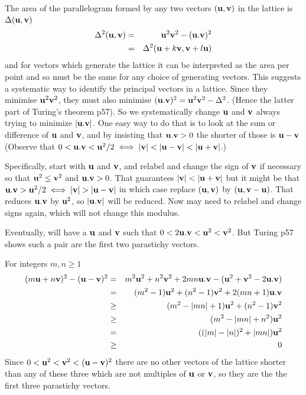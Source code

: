 \documentclass[a4paper]{article}
\newcommand{\uvec}{{\bf u}}
\newcommand{\vvec}{{\bf v}}
\begin{document}
The area of the parallelogram formed by any two vectors $(\uvec,\vvec)$ in the lattice is $\Delta(\uvec,\vvec)$
\begin{eqnarray}
\Delta^2(\uvec,\vvec) &=& \uvec^2 \vvec^2 - (\uvec. \vvec)^2
\\
&=& \Delta^2(\uvec+k\vvec,\vvec+l\uvec)
\end{eqnarray}
and for vectors which generate the lattice it can be interpreted as the area per point
and so must be the same for any choice of generating vectors. This suggests a
systematic way to identify the principal vectors in a lattice. Since they minimise $\uvec^2\vvec^2$,
they must also minimise $ (\uvec. \vvec)^2 = \uvec^2 \vvec^2 - \Delta^2$. (Hence the latter part of Turing's theorem p57).
So we systematically
change $\uvec$ and $\vvec$ always trying to minimize $\left|\uvec. \vvec\right|$.
One easy way to do that is to look at the sum or difference of $\uvec$ and $\vvec$, and
by insisting that $\uvec. \vvec>0$ the shorter of those is $\uvec-\vvec$ (Observe
that $0<\uvec.\vvec < \uvec^2/2 \iff  \left|\vvec\right|<\left|\uvec-\vvec\right|<\left|\uvec+\vvec\right|$.)


Specifically, start with  $\uvec$ and  $ \vvec$, and relabel and change the sign of
$\vvec$ if necessary so that  $\uvec^2\leq\vvec^2$ and $\uvec. \vvec>0$. That guarantees
$\left|\vvec\right|<\left|\uvec+\vvec\right|$ but it might be that
$\uvec.\vvec>\uvec^2/2 \iff \left|\vvec\right|>\left|\uvec-\vvec\right|$ in which case replace $(\uvec,\vvec)$ by
$(\uvec,\vvec-\uvec)$. That reduces $\uvec.\vvec$ by $\uvec^2$, so
 $\left|\uvec.\vvec\right|$ will
be reduced.  Now may need to relabel and change signs again, which will not change this modulus.


Eventually, will have a $\uvec$ and  $ \vvec$ such that
$0<2\uvec.\vvec < \uvec^2 <\vvec^2$. But Turing p57 shows such a pair are the first two parastichy vectors.

For integers $m,n\geq 1$
\begin{eqnarray}
(m\uvec+n\vvec)^2 - (\uvec-\vvec)^2
 &=& m^2 \uvec^2 +n^2 \vvec^2 + 2 mn \uvec.\vvec - (\uvec^2+\vvec^2-2\uvec.\vvec)
\\
&=& (m^2 -1)\uvec^2 +(n^2-1) \vvec^2 + 2( mn+1) \uvec.\vvec
\\
&\geq& (m^2-\left|mn\right|+1)\uvec^2 + (n^2-1)\vvec^2
\\
&\geq& (m^2-\left|mn\right|+n^2)\uvec^2
\\
&=& ((\left|m\right|-\left|n\right|)^2+\left|mn\right| )\uvec^2
\\
&\geq&0
\end{eqnarray}
Since $0< \uvec^2 <\vvec^2<(\uvec-\vvec)^2$ there are no other vectors of the lattice shorter
than any of these three which are not multiples of $\uvec$ or $\vvec$, so they are the
the first three parastichy vectors.
\end{document}
